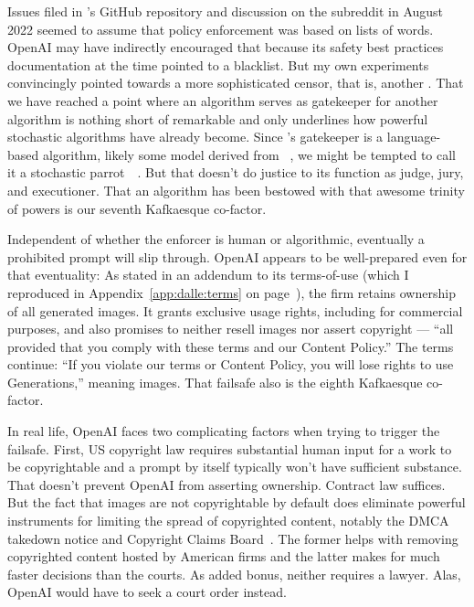 Issues filed in \DALLE's GitHub repository and discussion on the subreddit in
August 2022 seemed to assume that policy enforcement was based on lists of
words. OpenAI may have indirectly encouraged that because its safety best
practices documentation at the time pointed to a  blacklist. But my own
experiments convincingly pointed towards a more sophisticated censor, that is,
another \AI. That we have reached a point where an algorithm serves as
gatekeeper for another algorithm is nothing short of remarkable and only
underlines how powerful stochastic algorithms have already become. Since
\DALLE's gatekeeper is a language-based algorithm, likely some model derived
from \GPT~\cite{BrownMannea2020}, we might be tempted to call it a stochastic
parrot~~\cite{BenderGebruea2021}. But that doesn't do justice to
its function as judge, jury, and executioner. That an algorithm has been
bestowed with that awesome trinity of powers is our seventh Kafkaesque
co-factor.

Independent of whether the enforcer is human or algorithmic, eventually a
prohibited prompt will slip through. OpenAI appears to be well-prepared even for
that eventuality: As stated in an addendum to its terms-of-use (which I
reproduced in Appendix~\ref{app:dalle:terms} on
page~\pageref{app:dalle:terms}), the firm retains ownership of all generated
images. It grants exclusive usage rights, including for commercial purposes, and
also promises to neither resell images nor assert copyright — ``all provided
that you comply with these terms and our Content Policy.'' The terms continue:
``If you violate our terms or Content Policy, you will lose rights to use
Generations,'' meaning images. That failsafe also is the eighth Kafkaesque
co-factor.

In real life, OpenAI faces two complicating factors when trying to trigger the
failsafe. First, US copyright law requires substantial human input for a work to
be copyrightable and a prompt by itself typically won't have sufficient
substance. That doesn't prevent OpenAI from asserting ownership. Contract law
suffices. But the fact that images are not copyrightable by default does
eliminate powerful instruments for limiting the spread of copyrighted content,
notably the DMCA takedown notice and Copyright Claims Board~\cite{CCB2022}. The
former helps with removing copyrighted content hosted by American firms and the
latter makes for much faster decisions than the courts. As added bonus, neither
requires a lawyer. Alas, OpenAI would have to seek a court order instead.

